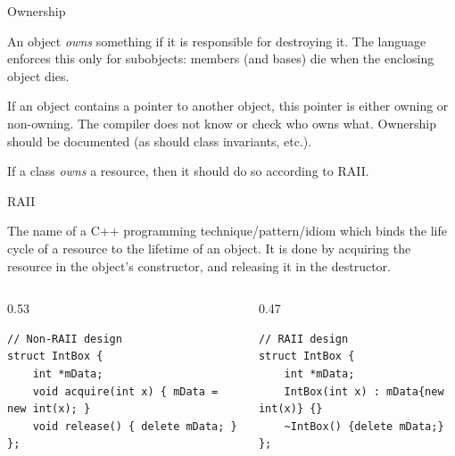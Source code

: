 \begin{frame}[fragile]{Ownership}
  \begin{sqt:definition}
    An object \emph{owns} something if it is responsible for destroying it.
    The language enforces this only for subobjects:
    members (and bases) die when the enclosing object dies.
  \end{sqt:definition}

  If an object contains a pointer to another object, this pointer is either owning or non-owning.
  The compiler does not know or check who owns what.
  Ownership should be documented (as should class invariants, etc.).

  \begin{sqt:result}
    If a class \emph{owns} a resource, then it should do so according to RAII.
  \end{sqt:result}
\end{frame}

\begin{frame}[fragile]{RAII}
  \begin{sqt:definition}
    The name of a C++ programming technique/pattern/idiom which binds the life cycle of a resource to the lifetime of an object.
    It is done by acquiring the resource in the object's constructor, and releasing it in the destructor.
  \end{sqt:definition}

  \begin{columns}[T]
    \begin{column}{0.53\textwidth}
      \begin{verbatim}
// Non-RAII design
struct IntBox {
    int *mData;
    void acquire(int x) { mData = new int(x); }
    void release() { delete mData; }
};
      \end{verbatim}
    \end{column}
    \begin{column}{0.47\textwidth}
      \begin{verbatim}
// RAII design
struct IntBox {
    int *mData;
    IntBox(int x) : mData{new int(x)} {}
    ~IntBox() {delete mData;}
};
      \end{verbatim}
    \end{column}
  \end{columns}
\end{frame}
